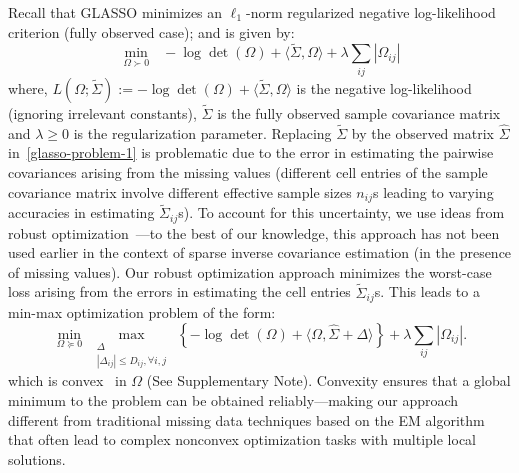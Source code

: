 Recall that GLASSO minimizes an $\ell_{1}$-norm regularized negative log-likelihood criterion (fully observed case); and is given by:
\begin{equation}\label{glasso-problem-1}
\min_{\Omega \succ 0}~~~ -\log\det(\Omega) + \langle \tilde{\Sigma}, \Omega \rangle + \lambda \sum_{ij} |\Omega_{ij}|
\end{equation}
where, $L(\Omega; \tilde{\Sigma}):=-\log\det(\Omega) + \langle \tilde{\Sigma}, \Omega \rangle$ is the negative log-likelihood (ignoring irrelevant constants), $\tilde{\Sigma}$ is the fully observed sample covariance matrix and $\lambda \geq 0$ is the regularization parameter. 
Replacing $\tilde{\Sigma}$ by the observed matrix $\hat{\Sigma}$ in~\eqref{glasso-problem-1} is problematic 
due to the error in estimating the pairwise covariances arising from the
missing values (different cell entries of the sample covariance matrix involve different effective sample sizes $n_{ij}$s leading to varying accuracies in estimating $\tilde{\Sigma}_{ij}$s). To account for this uncertainty, we use ideas from robust optimization~\cite{ben2009robust,bertsimas2011theory}---to the best of our knowledge, this approach has not been used earlier in the context of sparse inverse covariance estimation (in the presence of missing values).
Our robust optimization approach minimizes the worst-case loss arising from the errors in estimating the cell entries $\tilde{\Sigma}_{ij}$s. This leads to a min-max optimization problem of the form:
\begin{equation}\label{eq:opt2-RM}
    \min_{\Omega \succeq 0} ~ \max_{\substack{\Delta \\ 
    |\Delta_{ij}| \leq D_{ij}, \forall i,j}}~ 
    \left \{ -\log \det( \Omega) + \langle\Omega, \hat{\Sigma} + \Delta \rangle \right\} + \lambda \sum_{ij} |\Omega_{ij}| .
\end{equation}
which is convex~\cite{BV2004} in $\Omega$ (See Supplementary Note).
Convexity ensures that a global minimum to the problem can be obtained reliably---making our approach different from traditional missing data techniques based on the EM algorithm~\cite{Dempster1977} that often lead to complex nonconvex optimization tasks with multiple local solutions. 

